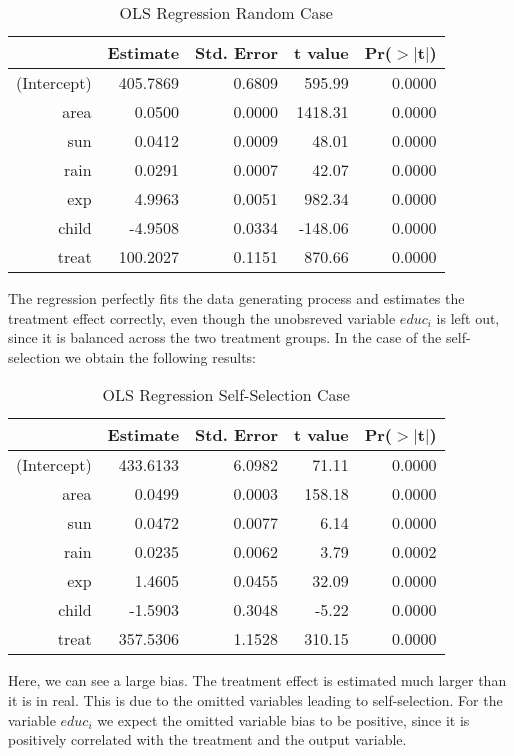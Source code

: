 \begin{enumerate}
\begin{table}[h!]
\centering
\begin{threeparttable}
\caption{OLS Regression Random Case} \label{tab:reg1}
\begin{tabular}{rrrrr}
  \hline
 & Estimate & Std. Error & t value & Pr({$>$}{$|$}t$|$) \\ 
  \hline
(Intercept) & 405.7869 & 0.6809 & 595.99 & 0.0000 \\ 
  area & 0.0500 & 0.0000 & 1418.31 & 0.0000 \\ 
  sun & 0.0412 & 0.0009 & 48.01 & 0.0000 \\ 
  rain & 0.0291 & 0.0007 & 42.07 & 0.0000 \\ 
  exp & 4.9963 & 0.0051 & 982.34 & 0.0000 \\ 
  child & -4.9508 & 0.0334 & -148.06 & 0.0000 \\ 
  treat & 100.2027 & 0.1151 & 870.66 & 0.0000 \\ 
   \hline
\end{tabular}
\end{threeparttable}
\end{table}

The regression perfectly fits the data generating process and estimates the treatment effect correctly, even though the unobsreved variable $\textit{educ}_i$ is left out, since it is balanced across the two treatment groups. In the case of the self-selection we obtain the following results:

\begin{table}[h!]
\centering
\begin{threeparttable}
\caption{OLS Regression Self-Selection Case} \label{tab:reg2}
\begin{tabular}{rrrrr}
  \hline
 & Estimate & Std. Error & t value & Pr({$>$}{$|$}t$|$) \\ 
  \hline
(Intercept) & 433.6133 & 6.0982 & 71.11 & 0.0000 \\ 
  area & 0.0499 & 0.0003 & 158.18 & 0.0000 \\ 
  sun & 0.0472 & 0.0077 & 6.14 & 0.0000 \\ 
  rain & 0.0235 & 0.0062 & 3.79 & 0.0002 \\ 
  exp & 1.4605 & 0.0455 & 32.09 & 0.0000 \\ 
  child & -1.5903 & 0.3048 & -5.22 & 0.0000 \\ 
  treat & 357.5306 & 1.1528 & 310.15 & 0.0000 \\ 
   \hline
\end{tabular}
\end{threeparttable}
\end{table}

Here, we can see a large bias. The treatment effect is estimated much larger than it is in real. This is due to the omitted variables leading to self-selection. For the variable $\textit{educ}_i$ we expect the omitted variable bias to be positive, since it is positively correlated with the treatment and the output variable. 

\end{enumerate}


